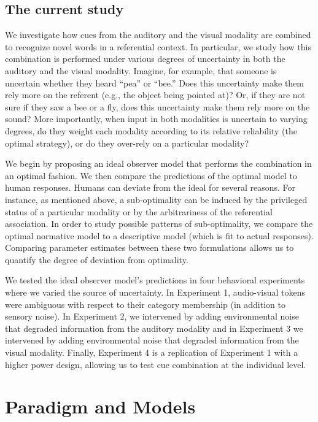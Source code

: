 \documentclass[english,,man,floatsintext]{apa6}
\theoremstyle{definition}
\theoremstyle{definition}
\theoremstyle{definition}
\theoremstyle{remark}
\begin{document}
\subsection{The current study}\label{the-current-study}

We investigate how cues from the auditory and the visual modality are
combined to recognize novel words in a referential context. In
particular, we study how this combination is performed under various
degrees of uncertainty in both the auditory and the visual modality.
Imagine, for example, that someone is uncertain whether they heard
\enquote{pea} or \enquote{bee.} Does this uncertainty make them rely
more on the referent (e.g., the object being pointed at)? Or, if they
are not sure if they saw a bee or a fly, does this uncertainty make them
rely more on the sound? More importantly, when input in both modalities
is uncertain to varying degrees, do they weight each modality according
to its relative reliability (the optimal strategy), or do they over-rely
on a particular modality?

We begin by proposing an ideal observer model that performs the
combination in an optimal fashion. We then compare the predictions of
the optimal model to human responses. Humans can deviate from the ideal
for several reasons. For instance, as mentioned above, a sub-optimality
can be induced by the privileged status of a particular modality or by
the arbitrariness of the referential association. In order to study
possible patterns of sub-optimality, we compare the optimal normative
model to a descriptive model (which is fit to actual responses).
Comparing parameter estimates between these two formulations allows us
to quantify the degree of deviation from optimality.

We tested the ideal observer model's predictions in four behavioral
experiments where we varied the source of uncertainty. In Experiment 1,
audio-visual tokens were ambiguous with respect to their category
membership (in addition to sensory noise). In Experiment 2, we
intervened by adding environmental noise that degraded information from
the auditory modality and in Experiment 3 we intervened by adding
environmental noise that degraded information from the visual modality.
Finally, Experiment 4 is a replication of Experiment 1 with a higher
power design, allowing us to test cue combination at the individual
level.

\section{Paradigm and Models}\label{paradigm-and-models}
\end{document}
